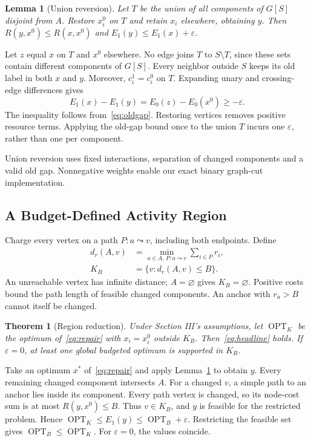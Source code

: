 \documentclass[conference]{IEEEtran}
\newtheorem{theorem}{Theorem}
\newtheorem{lemma}{Lemma}
\newcommand{\opt}{\operatorname{OPT}}
\newcommand{\eps}{\varepsilon}
\begin{document}
\begin{lemma}[Union reversion]\label{lem:revert}
Let $T$ be the union of all components of $G[S]$ disjoint from $A$. Restore $x_i^0$ on $T$ and retain $x_i$ elsewhere, obtaining $y$. Then $R(y,x^0)\leq R(x,x^0)$ and $E_1(y)\leq E_1(x)+\eps$.
\end{lemma}
\begin{IEEEproof}
Let $z$ equal $x$ on $T$ and $x^0$ elsewhere. No edge joins $T$ to $S\setminus T$, since these sets contain different components of $G[S]$. Every neighbor outside $S$ keeps its old label in both $x$ and $y$. Moreover, $c_i^1=c_i^0$ on $T$. Expanding unary and crossing-edge differences gives
\begin{equation}
 E_1(x)-E_1(y)=E_0(z)-E_0(x^0)\geq-\eps.\label{eq:cancellation}
\end{equation}
The inequality follows from~\eqref{eq:oldgap}. Restoring vertices removes positive resource terms. Applying the old-gap bound once to the union $T$ incurs one $\eps$, rather than one per component.
\end{IEEEproof}

Union reversion uses fixed interactions, separation of changed components and a valid old gap. Nonnegative weights enable our exact binary graph-cut implementation.

\subsection{A Budget-Defined Activity Region}
Charge every vertex on a path $P:a\leadsto v$, including both endpoints. Define
\begin{equation}
 \begin{aligned}
 d_r(A,v)&=\min_{a\in A,\,P:a\leadsto v}\sum_{i\in P}r_i,\\
 K_B&=\{v:d_r(A,v)\leq B\}.
 \end{aligned}\label{eq:region}
\end{equation}
An unreachable vertex has infinite distance; $A=\varnothing$ gives $K_B=\varnothing$. Positive costs bound the path length of feasible changed components. An anchor with $r_a>B$ cannot itself be changed.

\begin{theorem}[Region reduction]\label{thm:region}
Under Section III's assumptions, let $\opt_K$ be the optimum of~\eqref{eq:repair} with $x_i=x_i^0$ outside $K_B$. Then~\eqref{eq:headline} holds. If $\eps=0$, at least one global budgeted optimum is supported in $K_B$.
\end{theorem}
\begin{IEEEproof}
Take an optimum $x^*$ of~\eqref{eq:repair} and apply Lemma~\ref{lem:revert} to obtain $y$. Every remaining changed component intersects $A$. For a changed $v$, a simple path to an anchor lies inside its component. Every path vertex is changed, so its node-cost sum is at most $R(y,x^0)\leq B$. Thus $v\in K_B$, and $y$ is feasible for the restricted problem. Hence $\opt_K\leq E_1(y)\leq\opt_B+\eps$. Restricting the feasible set gives $\opt_B\leq\opt_K$. For $\eps=0$, the values coincide.
\end{IEEEproof}
\end{document}
